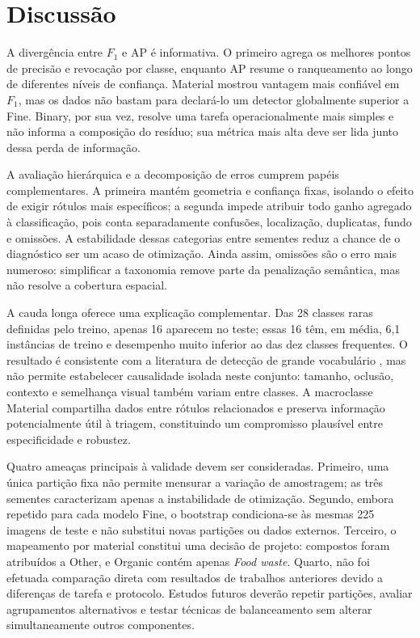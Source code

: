 \section{Discussão}

A divergência entre $F_1$ e AP é informativa. O primeiro agrega os melhores pontos de precisão e revocação por classe, enquanto AP resume o ranqueamento ao longo de diferentes níveis de confiança. Material mostrou vantagem mais confiável em $F_1$, mas os dados não bastam para declará-lo um detector globalmente superior a Fine. Binary, por sua vez, resolve uma tarefa operacionalmente mais simples e não informa a composição do resíduo; sua métrica mais alta deve ser lida junto dessa perda de informação.

A avaliação hierárquica e a decomposição de erros cumprem papéis complementares. A primeira mantém geometria e confiança fixas, isolando o efeito de exigir rótulos mais específicos; a segunda impede atribuir todo ganho agregado à classificação, pois conta separadamente confusões, localização, duplicatas, fundo e omissões. A estabilidade dessas categorias entre sementes reduz a chance de o diagnóstico ser um acaso de otimização. Ainda assim, omissões são o erro mais numeroso: simplificar a taxonomia remove parte da penalização semântica, mas não resolve a cobertura espacial.

A cauda longa oferece uma explicação complementar. Das 28 classes raras definidas pelo treino, apenas 16 aparecem no teste; essas 16 têm, em média, 6,1 instâncias de treino e desempenho muito inferior ao das dez classes frequentes. O resultado é consistente com a literatura de detecção de grande vocabulário \cite{gupta2019lvis}, mas não permite estabelecer causalidade isolada neste conjunto: tamanho, oclusão, contexto e semelhança visual também variam entre classes. A macroclasse Material compartilha dados entre rótulos relacionados e preserva informação potencialmente útil à triagem, constituindo um compromisso plausível entre especificidade e robustez.

Quatro ameaças principais à validade devem ser consideradas. Primeiro, uma única partição fixa não permite mensurar a variação de amostragem; as três sementes caracterizam apenas a instabilidade de otimização. Segundo, embora repetido para cada modelo Fine, o bootstrap condiciona-se às mesmas 225 imagens de teste e não substitui novas partições ou dados externos. Terceiro, o mapeamento por material constitui uma decisão de projeto: compostos foram atribuídos a Other, e Organic contém apenas \textit{Food waste}. Quarto, não foi efetuada comparação direta com resultados de trabalhos anteriores devido a diferenças de tarefa e protocolo. Estudos futuros deverão repetir partições, avaliar agrupamentos alternativos e testar técnicas de balanceamento sem alterar simultaneamente outros componentes.
